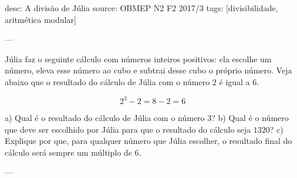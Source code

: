 desc:  A divisão de Júlia
source:  OBMEP N2 F2 2017/3
tags:  [divisibilidade, aritmética modular]

---

Júlia faz o seguinte cálculo com números inteiros positivos: ela escolhe um número, eleva esse número ao cubo e subtrai desse cubo o próprio número. Veja abaixo que o resultado do cálculo de Júlia com o número $2$ é igual a $6$.

\[2^3 - 2 = 8 - 2 = 6\]

a) Qual é o resultado do cálculo de Júlia com o número $3$?
b) Qual é o número que deve ser escolhido por Júlia para que o resultado do cálculo seja $1320$?
c) Explique por que, para qualquer número que Júlia escolher, o resultado final do cálculo será sempre um múltiplo de $6$.

---
